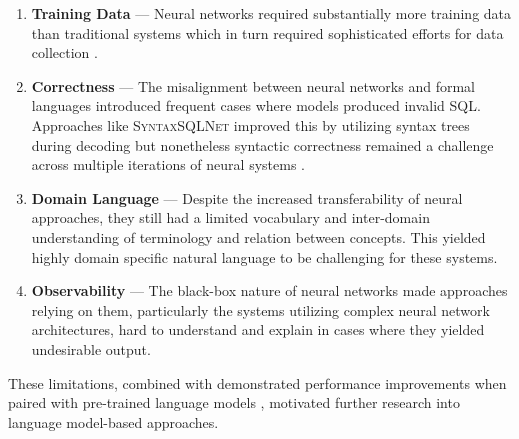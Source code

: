\begin{enumerate}
    \item \textbf{Training Data} — Neural networks required substantially more
        training data than traditional systems which in turn required
        sophisticated efforts for data collection \citep{Spider}.
    \item \textbf{Correctness} — The misalignment between neural networks
        and formal languages introduced frequent cases where models produced
        invalid SQL. Approaches like \textsc{SyntaxSQLNet} improved this by
        utilizing syntax trees during decoding but nonetheless syntactic
        correctness remained a challenge across multiple iterations of neural
        systems \citep{SyntaxSQLNet}.
    \item \textbf{Domain Language} — Despite the increased transferability
        of neural approaches, they still had a limited vocabulary and
        inter-domain understanding of terminology and relation
        between concepts. This yielded highly domain specific natural language
        to be challenging for these systems.
    \item \textbf{Observability} — The black-box nature of neural networks made
        approaches relying on them, particularly the systems utilizing complex
        neural network architectures, hard to understand and explain in cases
        where they yielded undesirable output. 
\end{enumerate}

These limitations, combined with demonstrated performance improvements when
paired with pre-trained language models \citep{RATSQL}, motivated further
research into language model-based approaches.
